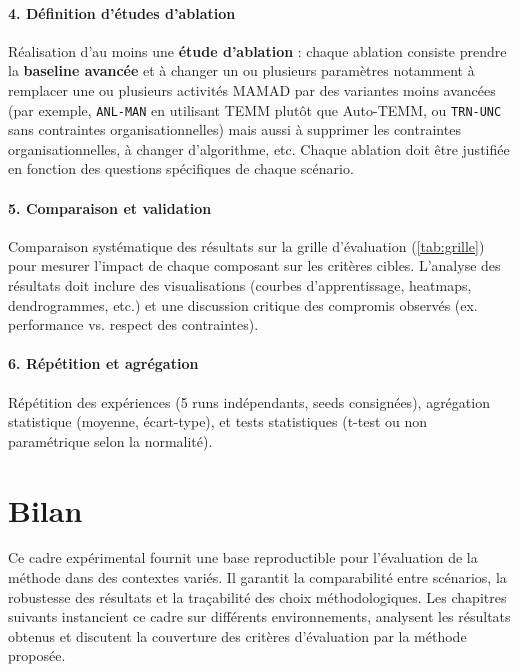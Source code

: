 \paragraph{4. Définition d’études d’ablation}
Réalisation d’au moins une \textbf{étude d’ablation} : chaque ablation consiste prendre la \textbf{baseline avancée} et à changer un ou plusieurs paramètres notamment à remplacer une ou plusieurs activités MAMAD par des variantes moins avancées (par exemple, \texttt{ANL-MAN} en utilisant TEMM plutôt que Auto-TEMM, ou \texttt{TRN-UNC} sans contraintes organisationnelles) mais aussi à supprimer les contraintes organisationnelles, à changer d’algorithme, etc. Chaque ablation doit être justifiée en fonction des questions spécifiques de chaque scénario.

\paragraph{5. Comparaison et validation}
Comparaison systématique des résultats sur la grille d’évaluation (\autoref{tab:grille}) pour mesurer l’impact de chaque composant sur les critères cibles. L'analyse des résultats doit inclure des visualisations (courbes d’apprentissage, heatmaps, dendrogrammes, etc.) et une discussion critique des compromis observés (ex. performance vs. respect des contraintes).

\paragraph{6. Répétition et agrégation}
Répétition des expériences (5 runs indépendants, seeds consignées), agrégation statistique (moyenne, écart-type), et tests statistiques (t-test ou non paramétrique selon la normalité).


\section*{Bilan}

Ce cadre expérimental fournit une base reproductible pour l’évaluation de la méthode  dans des contextes variés. Il garantit la comparabilité entre scénarios, la robustesse des résultats et la traçabilité des choix méthodologiques. Les chapitres suivants instancient ce cadre sur différents environnements, analysent les résultats obtenus et discutent la couverture des critères d’évaluation par la méthode proposée.


\clearpage
\thispagestyle{empty}
\null
\newpage


